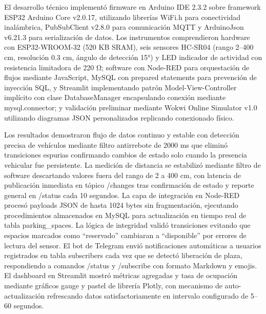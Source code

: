 \documentclass[12pt,a4paper]{article}
\begin{document}
El desarrollo técnico implementó firmware en Arduino IDE 2.3.2 sobre framework ESP32 Arduino Core v2.0.17, utilizando librerías WiFi.h para conectividad inalámbrica, PubSubClient v2.8.0 para comunicación MQTT y ArduinoJson v6.21.3 para serialización de datos. Los instrumentos comprendieron hardware con ESP32-WROOM-32 (520 KB SRAM), seis sensores HC-SR04 (rango 2--400 cm, resolución 0.3 cm, ángulo de detección 15°) y LED indicador de actividad con resistencia limitadora de 220 \unit{\ohm}; software con Node-RED para orquestación de flujos mediante JavaScript, MySQL con prepared statements para prevención de inyección SQL, y Streamlit implementando patrón Model-View-Controller implícito con clase DatabaseManager encapsulando conexión mediante mysql.connector; y validación preliminar mediante Wokwi Online Simulator v1.0 utilizando diagramas JSON personalizados replicando conexionado físico.

Los resultados demostraron flujo de datos continuo y estable con detección precisa de vehículos mediante filtro antirrebote de 2000 ms que eliminó transiciones espurias confirmando cambios de estado solo cuando la presencia vehicular fue persistente. La medición de distancia se estabilizó mediante filtro de software descartando valores fuera del rango de 2 a 400 cm, con latencia de publicación inmediata en tópico /changes tras confirmación de estado y reporte general en /status cada 10 segundos. La capa de integración en Node-RED procesó payloads JSON de hasta 1024 bytes sin fragmentación, ejecutando procedimientos almacenados en MySQL para actualización en tiempo real de tabla parking\_spaces. La lógica de integridad validó transiciones evitando que espacios marcados como ``reservado'' cambiaran a ``disponible'' por errores de lectura del sensor. El bot de Telegram envió notificaciones automáticas a usuarios registrados en tabla subscribers cada vez que se detectó liberación de plaza, respondiendo a comandos /status y /subscribe con formato Markdown y emojis. El dashboard en Streamlit mostró métricas agregadas y tasa de ocupación mediante gráficos gauge y pastel de librería Plotly, con mecanismo de auto-actualización refrescando datos satisfactoriamente en intervalo configurado de 5--60 segundos.
\end{document}
